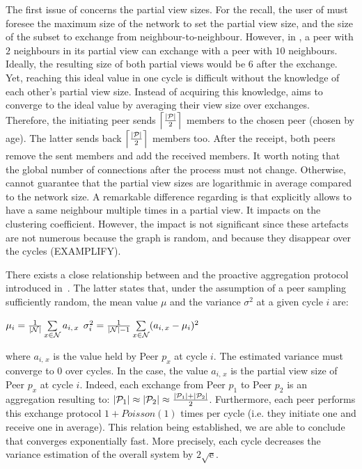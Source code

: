 The first issue of \CYCLON{} concerns the partial view sizes. For the recall,
the user of \CYCLON{} must foresee the maximum size of the network to set the
partial view size, and the size of the subset to exchange from
neighbour-to-neighbour.  However, in \SCAMPLON{}, a peer with $2$ neighbours in
its partial view can exchange with a peer with $10$ neighbours. Ideally, the
resulting size of both partial views would be $6$ after the exchange. Yet,
reaching this ideal value in one cycle is difficult without the knowledge of
each other's partial view size. Instead of acquiring this knowledge,
\SCAMPLON{} aims to converge to the ideal value by averaging their view size
over exchanges. Therefore, the initiating peer sends
$\left\lceil|\mathcal{P}|\over{2}\right\rceil$ members to the chosen peer
(chosen by age). The latter sends back
$\left\lceil|\mathcal{P}|\over{2}\right\rceil$ members too. After the receipt,
both peers remove the sent members and add the received members. It worth
noting that the global number of connections after the process must not
change. Otherwise, \SCAMPLON{} cannot guarantee that the partial view sizes are
logarithmic in average compared to the network size.  A remarkable difference
regarding \CYCLON{} is that \SCAMPLON{} explicitly allows to have a same
neighbour multiple times in a partial view. It impacts on the clustering
coefficient. However, the impact is not significant since these artefacts are
not numerous because the graph is random, and because they disappear over the
\SCAMPLON{} cycles (EXAMPLIFY).

There exists a close relationship between \SCAMPLON{} and the proactive
aggregation protocol introduced
in~\cite{jelasity2004epidemic,montresor2004robust}. The latter states that,
under the assumption of a peer sampling sufficiently random, the mean value
$\mu$ and the variance $\sigma^2$ at a given cycle $i$ are:
\begin{center}
  $\mu_i = {1\over{|\mathcal{N}|}} \sum\limits_{x \in \mathcal{N}} a_{i,\,x}$
  \hfill
  $\sigma^2_i = {1\over{|\mathcal{N}|-1}}\sum\limits_{x \in \mathcal{N}}
  (a_{i,\,x} - \mu_i)^2$
\end{center}
where $a_{i,\,x}$ is the value held by Peer $p_x$ at cycle $i$. The estimated
variance must converge to $0$ over cycles. In the \SCAMPLON{} case, the value
$a_{i,\,x}$ is the partial view size of Peer $p_x$ at cycle $i$. Indeed, each
exchange from Peer $p_1$ to Peer $p_2$ is an aggregation resulting to:
$|\mathcal{P}_1|\approx|\mathcal{P}_2|\approx{|\mathcal{P}_1| + |\mathcal{P}_2|
  \over{2}}$.
Furthermore, each peer performs this exchange protocol $1+Poisson(1)$ times per
cycle (i.e. they initiate one and receive one in average).  This relation being
established, we are able to conclude that \SCAMPLON{} converges exponentially
fast. More precisely, each cycle decreases the variance estimation of the
overall system by ${2\sqrt{\text{e}}}$.


